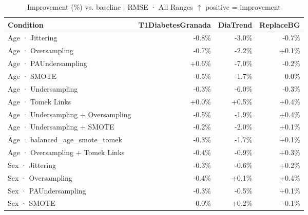 \begin{table}[htbp]
\centering
\small
\caption{Improvement (\%) vs. baseline  |  RMSE · All Ranges  $\uparrow$ positive = improvement}
\label{tab:delta_rmse_entire}
\begin{tabular}{lrrr}
\toprule
\textbf{Condition} & \textbf{T1DiabetesGranada} & \textbf{DiaTrend} & \textbf{ReplaceBG} \\
\midrule
Age · Jittering & \textcolor{BrickRed}{-0.8\%} & \textcolor{BrickRed}{-3.0\%} & \textcolor{BrickRed}{-0.7\%} \\
Age · Oversampling & \textcolor{BrickRed}{-0.7\%} & \textcolor{BrickRed}{-2.2\%} & \textcolor{OliveGreen}{+0.1\%} \\
Age · PAUndersampling & \textcolor{OliveGreen}{+0.6\%} & \textcolor{BrickRed}{-7.0\%} & \textcolor{BrickRed}{-0.2\%} \\
Age · SMOTE & \textcolor{BrickRed}{-0.5\%} & \textcolor{BrickRed}{-1.7\%} & \textcolor{black}{0.0\%} \\
Age · Undersampling & \textcolor{BrickRed}{-0.3\%} & \textcolor{BrickRed}{-6.0\%} & \textcolor{BrickRed}{-0.3\%} \\
Age · Tomek Links & \textcolor{OliveGreen}{+0.0\%} & \textcolor{OliveGreen}{+0.5\%} & \textcolor{OliveGreen}{+0.4\%} \\
Age · Undersampling + Oversampling & \textcolor{BrickRed}{-0.5\%} & \textcolor{BrickRed}{-1.9\%} & \textcolor{OliveGreen}{+0.4\%} \\
Age · Undersampling + SMOTE & \textcolor{BrickRed}{-0.2\%} & \textcolor{BrickRed}{-2.0\%} & \textcolor{OliveGreen}{+0.1\%} \\
Age · balanced_age_smote_tomek & \textcolor{BrickRed}{-0.3\%} & \textcolor{BrickRed}{-1.7\%} & \textcolor{OliveGreen}{+0.1\%} \\
Age · Oversampling + Tomek Links & \textcolor{BrickRed}{-0.4\%} & \textcolor{BrickRed}{-0.9\%} & \textcolor{OliveGreen}{+0.3\%} \\
\midrule
Sex · Jittering & \textcolor{BrickRed}{-0.3\%} & \textcolor{BrickRed}{-0.6\%} & \textcolor{OliveGreen}{+0.2\%} \\
Sex · Oversampling & \textcolor{BrickRed}{-0.4\%} & \textcolor{OliveGreen}{+0.1\%} & \textcolor{OliveGreen}{+0.4\%} \\
Sex · PAUndersampling & \textcolor{BrickRed}{-0.3\%} & \textcolor{BrickRed}{-0.5\%} & \textcolor{OliveGreen}{+0.1\%} \\
Sex · SMOTE & \textcolor{black}{0.0\%} & \textcolor{OliveGreen}{+0.2\%} & \textcolor{BrickRed}{-0.1\%} \\

\end{tabular}
\end{table}
